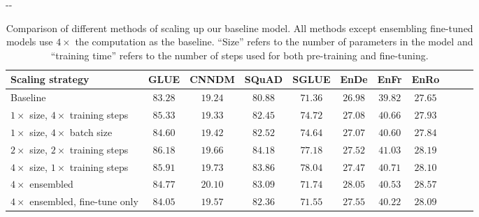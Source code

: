 \documentclass[twoside,11pt]{article}
\newlength{\offsetpage}
\newenvironment{widepage}{\begin{adjustwidth}{-\offsetpage}{-\offsetpage}
    \addtolength{\textwidth}{2\offsetpage}}
{\end{adjustwidth}}
\newcommand{\bsl}{\makebox[0pt][r]{\raisebox{0.05em}{$\bigstar\,$}}}
\def\*#1{\mathbf{#1}}
\begin{document}
\begin{table}
\footnotesize
\begin{widepage}
\centering
\begin{tabular}{l c c c c c c c c c c}
\toprule
    Scaling strategy                         & GLUE        & CNNDM       & SQuAD       & SGLUE       & EnDe        & EnFr        & EnRo    \\
\midrule
    \bsl Baseline                            & $83.28$     & $19.24$     & $80.88$     & $71.36$     & $26.98$     & $39.82$     & $27.65$ \\
    $1\times$ size, $4\times$ training steps & $85.33$     & $19.33$     & $82.45$     & $74.72$     & $27.08$     & $40.66$     & $27.93$ \\
    $1\times$ size, $4\times$ batch size     & $84.60$     & $19.42$     & $82.52$     & $74.64$     & $27.07$     & $40.60$     & $27.84$ \\
    $2\times$ size, $2\times$ training steps & $\*{86.18}$ & $19.66$     & $\*{84.18}$ & $77.18$     & $27.52$     & $\*{41.03}$ & $28.19$ \\
    $4\times$ size, $1\times$ training steps & $\*{85.91}$ & $19.73$     & $\*{83.86}$ & $\*{78.04}$ & $27.47$     & $40.71$     & $28.10$ \\
    $4\times$ ensembled                      & $84.77$     & $\*{20.10}$ & $83.09$     & $71.74$     & $\*{28.05}$ & $40.53$     & $\*{28.57}$  \\
    $4\times$ ensembled, fine-tune only      & $84.05$     & $19.57$     & $82.36$     & $71.55$     & $27.55$     & $40.22$     & $28.09$  \\
\bottomrule
\end{tabular}
\end{widepage}
\caption{
Comparison of different methods of scaling up our baseline model.
All methods except ensembling fine-tuned models use $4\times$ the computation as the baseline.
``Size'' refers to the number of parameters in the model and ``training time'' refers to the number of steps used for both pre-training and fine-tuning.
}
\label{tab:scaling}
\end{table}
\end{document}
